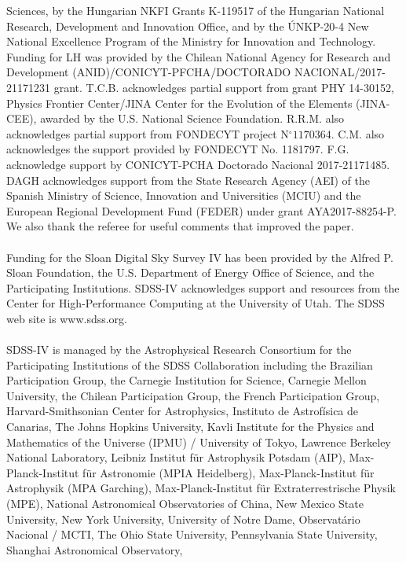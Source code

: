 \documentclass[onecolumn]{aa}
\begin{document}
\begin{acknowledgements}
Sciences, by the Hungarian NKFI Grants K-119517 of the Hungarian National
Research, Development and Innovation Office, and by the {\'U}NKP-20-4 New National Excellence Program of the
Ministry for Innovation and Technology.
Funding for LH was provided by the Chilean National Agency for Research and Development
(ANID)/CONICYT-PFCHA/DOCTORADO NACIONAL/2017-21171231 grant.
T.C.B. acknowledges partial support from grant PHY 14-30152, Physics Frontier Center/JINA Center for the Evolution of the Elements (JINA-CEE), awarded by the U.S. National Science Foundation.
R.R.M. also acknowledges partial support from  FONDECYT project N$^{\circ}1170364$.
C.M. also acknowledges  the support provided by  FONDECYT No. 1181797. 
F.G. acknowledge support by CONICYT-PCHA Doctorado Nacional 2017-21171485.
DAGH acknowledges support from the State Research Agency (AEI) of the
Spanish Ministry of Science, Innovation and Universities (MCIU) and the
European Regional Development Fund (FEDER) under grant AYA2017-88254-P. 
 We also thank the referee for useful comments that improved the paper.
\\\\
Funding for the Sloan Digital Sky Survey IV has been provided by the Alfred P. Sloan Foundation, the U.S. Department of Energy Office of Science, and the Participating Institutions. SDSS-IV acknowledges
support and resources from the Center for High-Performance Computing at
the University of Utah. The SDSS web site is www.sdss.org.
\\\\
SDSS-IV is managed by the Astrophysical Research Consortium for the 
Participating Institutions of the SDSS Collaboration including the 
Brazilian Participation Group, the Carnegie Institution for Science, 
Carnegie Mellon University, the Chilean Participation Group, the French Participation Group, Harvard-Smithsonian Center for Astrophysics, 
Instituto de Astrof\'isica de Canarias, The Johns Hopkins University, 
Kavli Institute for the Physics and Mathematics of the Universe (IPMU) / 
University of Tokyo, Lawrence Berkeley National Laboratory, 
Leibniz Institut f\"ur Astrophysik Potsdam (AIP),  
Max-Planck-Institut f\"ur Astronomie (MPIA Heidelberg), 
Max-Planck-Institut f\"ur Astrophysik (MPA Garching), 
Max-Planck-Institut f\"ur Extraterrestrische Physik (MPE), 
National Astronomical Observatories of China, New Mexico State University, 
New York University, University of Notre Dame, 
Observat\'ario Nacional / MCTI, The Ohio State University, 
Pennsylvania State University, Shanghai Astronomical Observatory, 

\end{acknowledgements}
\end{document}
